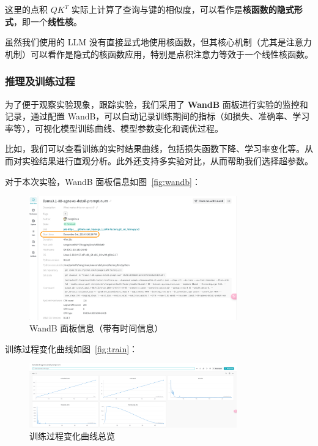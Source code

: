 这里的点积 \( QK^T \) 实际上计算了查询与键的相似度，可以看作是\textbf{核函数的隐式形式}，即一个\textbf{线性核}。

虽然我们使用的 LLM 没有直接显式地使用核函数，但其核心机制（尤其是注意力机制）可以看作是隐式的核函数应用，特别是点积注意力等效于一个线性核函数。

\subsubsection{推理及训练过程}

为了便于观察实验现象，跟踪实验，我们采用了 \textbf{WandB} 面板进行实验的监控和记录，通过配置 WandB，可以自动记录训练期间的指标（如损失、准确率、学习率等），可视化模型训练曲线、模型参数变化和调优过程。

比如，我们可以查看训练的实时结果曲线，包括损失函数下降、学习率变化等。从而对实验结果进行直观分析。此外还支持多实验对比，从而帮助我们选择超参数。

对于本次实验，WandB 面板信息如图~\autoref{fig:wandb}：\begin{figure}[htbp]
    \centering
    \includegraphics[width=0.8\textwidth]{images/wandb.png}
    \caption{WandB 面板信息（带有时间信息）}
    \label{fig:wandb}
\end{figure}

训练过程变化曲线如图~\autoref{fig:train}：\begin{figure}[htbp]
    \centering
    \includegraphics[width=0.8\textwidth]{images/board.png}
    \caption{训练过程变化曲线总览}
    \label{fig:train}
\end{figure}

